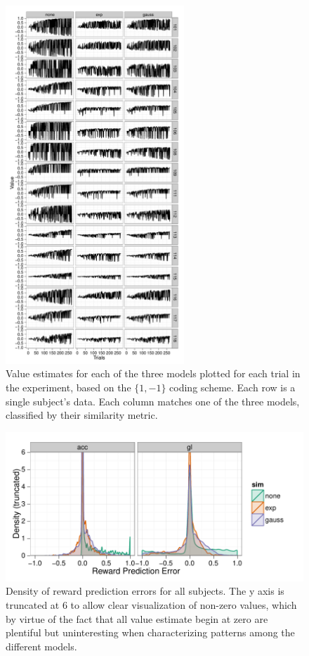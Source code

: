 \documentclass[doc,12pt]{apa}        %
\begin{document}
\begin{figure}[tp]
	\includegraphics[width=0.6\textwidth]{f_value_gl}
    \centering
	\caption{Value estimates for each of the three models plotted for each trial in the experiment, based on the $\{1,-1\}$ coding scheme.   Each row is a single subject's data.  Each column matches one of the three models, classified by their similarity metric.}
	\label{fig:valuegl}
\end{figure}
\begin{figure}[tp]
	\includegraphics{f_density_rpe}
    \centering
    \caption{Density of reward prediction errors for all subjects.  The y axis is truncated at 6 to allow clear visualization of non-zero values, which by virtue of the fact that all value estimate begin at zero are plentiful but uninteresting when characterizing patterns among the different models.}
	\label{fig:denrpe}
\end{figure}

\newpage

\end{document}
